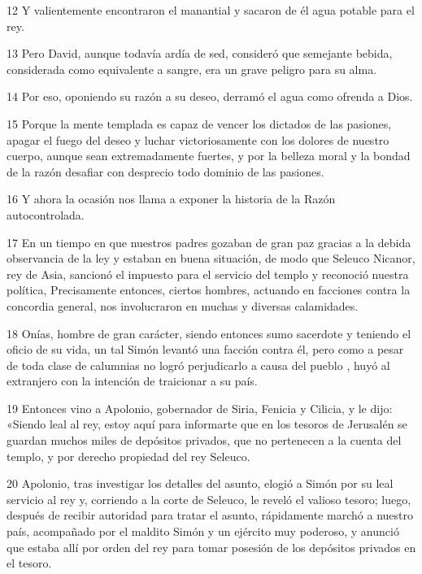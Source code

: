 \par 12 Y valientemente encontraron el manantial y sacaron de él agua potable para el rey.

\par 13 Pero David, aunque todavía ardía de sed, consideró que semejante bebida, considerada como equivalente a sangre, era un grave peligro para su alma.

\par 14 Por eso, oponiendo su razón a su deseo, derramó el agua como ofrenda a Dios.

\par 15 Porque la mente templada es capaz de vencer los dictados de las pasiones, apagar el fuego del deseo y luchar victoriosamente con los dolores de nuestro cuerpo, aunque sean extremadamente fuertes, y por la belleza moral y la bondad de la razón desafiar con desprecio todo dominio de las pasiones.

\par 16 Y ahora la ocasión nos llama a exponer la historia de la Razón autocontrolada.

\par 17 En un tiempo en que nuestros padres gozaban de gran paz gracias a la debida observancia de la ley y estaban en buena situación, de modo que Seleuco Nicanor, rey de Asia, sancionó el impuesto para el servicio del templo y reconoció nuestra política, Precisamente entonces, ciertos hombres, actuando en facciones contra la concordia general, nos involucraron en muchas y diversas calamidades.

\par 18 Onías, hombre de gran carácter, siendo entonces sumo sacerdote y teniendo el oficio de su vida, un tal Simón levantó una facción contra él, pero como a pesar de toda clase de calumnias no logró perjudicarlo a causa del pueblo , huyó al extranjero con la intención de traicionar a su país.

\par 19 Entonces vino a Apolonio, gobernador de Siria, Fenicia y Cilicia, y le dijo: «Siendo leal al rey, estoy aquí para informarte que en los tesoros de Jerusalén se guardan muchos miles de depósitos privados, que no pertenecen a la cuenta del templo, y por derecho propiedad del rey Seleuco.

\par 20 Apolonio, tras investigar los detalles del asunto, elogió a Simón por su leal servicio al rey y, corriendo a la corte de Seleuco, le reveló el valioso tesoro; luego, después de recibir autoridad para tratar el asunto, rápidamente marchó a nuestro país, acompañado por el maldito Simón y un ejército muy poderoso, y anunció que estaba allí por orden del rey para tomar posesión de los depósitos privados en el tesoro.

